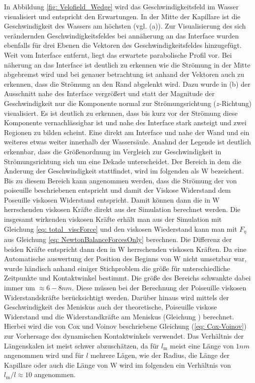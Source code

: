 In Abbildung \ref{fig: Velofield_Wedge} wird das Geschwindigkeitsfeld im Wasser visualisiert und entspricht den Erwartungen. In der Mitte der Kapillare ist die Geschwindigkeit des Wassers am höchsten (vgl. (a)). Zur Visualisierung des sich verändernden Geschwindigkeitsfeldes bei annäherung an das Interface wurden ebenfalls für drei Ebenen die Vektoren des Geschwindigkeitsfeldes hinzugefügt. Weit vom Interface entfernt, liegt das erwartete parabolische Profil vor. Bei näherung an das Interface ist deutlich zu erkennen wie die Strömung in der Mitte abgebremst wird und bei genauer betrachtung ist anhand der Vektoren auch zu erkennen, dass die Strömung an den Rand abgelenkt wird. Dazu wurde in (b) der Ausschnitt nahe des Interface vergrößert und statt der Magnitude der Geschwindigkeit nur die Komponente normal zur Strömungsrichtung ($z$-Richtung) visualisiert. Es ist deutlich zu erkennen, dass bis kurz vor der Strömung diese Komponente vernachlässigbar ist und nahe des Interface stark ansteigt und zwei Regionen zu bilden scheint. Eine direkt am Interface und nahe der Wand und ein weiteres etwas weiter innerhalb der Wassersäule. Anahnd der Legende ist deutlich erkennbar, dass die Größenordnung im Vergleich zur Geschwindigkeit in Strömungsrichtung sich um eine Dekade unterscheidet. Der Bereich in dem die Änderung der Geschwindigkeit stattfindet, wird im folgenden als $\mathrm{W}$ bezeichent. Bis zu diesem Bereich kann angenommen werden, dass die Strömung der von poiseuille beschriebenen entspricht und damit der Viskose Widerstand dem Poseuille viskosen Widerstand entspricht. Damit können dann die in $\mathrm{W}$ herrschenden viskosen Kräfte direkt aus der Simulation berechnet werden. Die insgesamt wirkenden viskosen Kräfte erhält man aus der Simulation mit Gleichung \ref*{eq: total_viscForce} und den viskosen Wiederstand kann man mit $F_{\eta}$ aus Gleichung \ref*{eq: NewtonBalanceForcesOnly} berechnen. Die Differenz der beiden Kräfte entspricht dann den in $\mathrm{W}$ herrschenden viskosen Kräften. Da eine Automatische auswertung der Position des Beginns von $\mathrm{W}$ nicht umsetzbar war, wurde händisch anhand einiger Stichproblem die größe für unterschiedliche Zeitpunkte und Kontaktwinkel bestimmt. Die größe des Bereichs schwankte dabei immer um $\approx 6-8nm$. Diese müssen bei der Berechnung der Poiseuille viskosen Widerstandskräfte berücksichtigt werden. 
Darüber hinaus wird mittels der Geschwindigkeit des Meniskus auch der theoretische, Poiseuille viskose Widerstand und die Widerstandkräfte am Meniskus (Gleichung ) berechnet. Hierbei wird die von Cox und Voinov beschriebene Gleichung (\ref*{eq: Cox-Voinov}) zur Vorhersage des dynamischen Kontaktwinkels verwendet. Das Verhältnis der Längenskalen ist meist schwer abzuschätzen, da für $l_{\mathrm{m}}$ meist eine Länge von $1nm$ angenommen wird und für $l$ mehrere Lägen, wie der Radius, die Länge der Kapillare oder auch die Länge von $\mathrm{W}$ wird im folgenden ein Verhältnis von $l_{\mathrm{m}}/l\approx10$ angenommen. 

